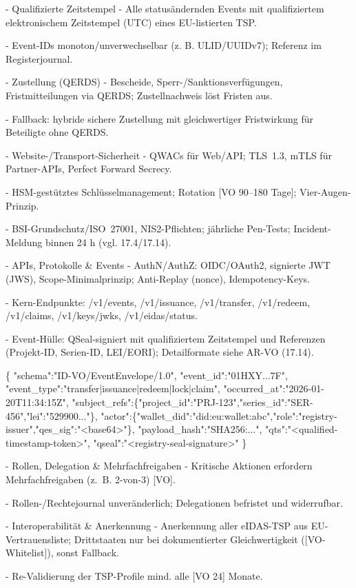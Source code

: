 \documentclass[12pt,a4paper]{scrartcl}
\begin{document}
- Qualifizierte Zeitstempel
- Alle statusändernden Events mit qualifiziertem elektronischem Zeitstempel (UTC) eines EU-listierten TSP.

- Event-IDs monoton/unverwechselbar (z. B. ULID/UUIDv7); Referenz im Registerjournal.

- Zustellung (QERDS)
- Bescheide, Sperr-/Sanktionsverfügungen, Fristmitteilungen via QERDS; Zustellnachweis löst Fristen aus.

- Fallback: hybride sichere Zustellung mit gleichwertiger Fristwirkung für Beteiligte ohne QERDS.

- Website-/Transport-Sicherheit
- QWACs für Web/API; TLS 1.3, mTLS für Partner-APIs, Perfect Forward Secrecy.

- HSM-gestütztes Schlüsselmanagement; Rotation [VO 90--180 Tage]; Vier-Augen-Prinzip.

- BSI-Grundschutz/ISO 27001, NIS2-Pflichten; jährliche Pen-Tests; Incident-Meldung binnen 24 h (vgl. 17.4/17.14).

- APIs, Protokolle \& Events
- AuthN/AuthZ: OIDC/OAuth2, signierte JWT (JWS), Scope-Minimalprinzip; Anti-Replay (nonce), Idempotency-Keys.

- Kern-Endpunkte: /v1/events, /v1/issuance, /v1/transfer, /v1/redeem, /v1/claims, /v1/keys/jwks, /v1/eidas/status.

- Event-Hülle: QSeal-signiert mit qualifiziertem Zeitstempel und Referenzen (Projekt-ID, Serien-ID, LEI/EORI); Detailformate siehe AR-VO (17.14).

\{
  "schema":"ID-VO/EventEnvelope/1.0",
  "event\_id":"01HXY...7F",
  "event\_type":"transfer|issuance|redeem|lock|claim",
  "occurred\_at":"2026-01-20T11:34:15Z",
  "subject\_refs":\{"project\_id":"PRJ-123","series\_id":"SER-456","lei":"529900..."\},
  "actor":\{"wallet\_did":"did:eu:wallet:abc","role":"registry-issuer","qes\_sig":"<base64>"\},
  "payload\_hash":"SHA256:...",
  "qts":"<qualified-timestamp-token>",
  "qseal":"<registry-seal-signature>"
\}

- Rollen, Delegation \& Mehrfachfreigaben
- Kritische Aktionen erfordern Mehrfachfreigaben (z. B. 2-von-3) [VO].

- Rollen-/Rechtejournal unveränderlich; Delegationen befristet und widerrufbar.

- Interoperabilität \& Anerkennung
- Anerkennung aller eIDAS-TSP aus EU-Vertrauensliste; Drittstaaten nur bei dokumentierter Gleichwertigkeit ([VO-Whitelist]), sonst Fallback.

- Re-Validierung der TSP-Profile mind. alle [VO 24] Monate.
\end{document}
